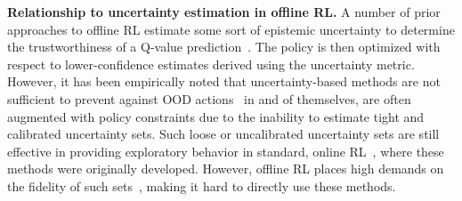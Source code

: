 \textbf{Relationship to uncertainty estimation in offline RL.} 
A number of prior approaches to offline RL estimate some sort of epistemic uncertainty to determine the trustworthiness of a Q-value prediction~\citep{kumar2019stabilizing,fujimoto2018off,agarwal2019optimistic,levine2020offline}.
The policy is then optimized with respect to lower-confidence estimates derived using the uncertainty metric. However, it has been empirically noted that uncertainty-based methods are not sufficient to prevent against OOD actions~\citep{fujimoto2018off,kumar2019stabilizing} in and of themselves, are often augmented with policy constraints due to the inability to estimate tight and calibrated uncertainty sets. Such loose or uncalibrated uncertainty sets are still effective in providing exploratory behavior in standard, online RL~\citep{osband2016deep,osband2017posterior}, where these methods were originally developed. However, offline RL places high demands on the fidelity of such sets~\citep{levine2020offline}, making it hard to directly use these methods.

